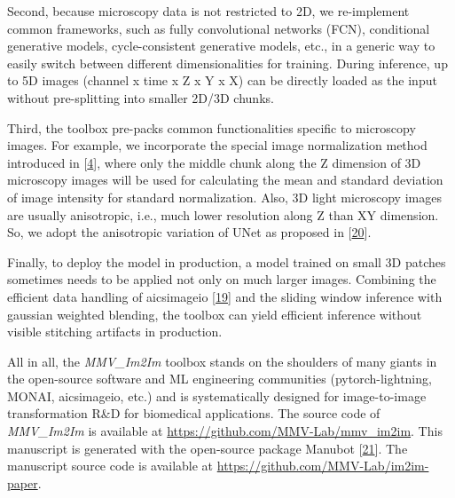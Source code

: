 Second, because microscopy data is not restricted to 2D, we re-implement common frameworks, such as fully convolutional networks (FCN), conditional generative models, cycle-consistent generative models, etc., in a generic way to easily switch between different dimensionalities for training. During inference, up to 5D images (channel x time x Z x Y x X) can be directly loaded as the input without pre-splitting into smaller 2D/3D chunks.

Third, the toolbox pre-packs common functionalities specific to microscopy images. For example, we incorporate the special image normalization method introduced in {[}\protect\hyperlink{ref-Yq8wZ6hc}{4}{]}, where only the middle chunk along the Z dimension of 3D microscopy images will be used for calculating the mean and standard deviation of image intensity for standard normalization. Also, 3D light microscopy images are usually anisotropic, i.e., much lower resolution along Z than XY dimension. So, we adopt the anisotropic variation of UNet as proposed in {[}\protect\hyperlink{ref-jM3v1UjQ}{20}{]}.

Finally, to deploy the model in production, a model trained on small 3D patches sometimes needs to be applied not only on much larger images. Combining the efficient data handling of aicsimageio {[}\protect\hyperlink{ref-gsfWGJKf}{19}{]} and the sliding window inference with gaussian weighted blending, the toolbox can yield efficient inference without visible stitching artifacts in production.

All in all, the \emph{MMV\_Im2Im} toolbox stands on the shoulders of many giants in the open-source software and ML engineering communities (pytorch-lightning, MONAI, aicsimageio, etc.) and is systematically designed for image-to-image transformation R\&D for biomedical applications. The source code of \emph{MMV\_Im2Im} is available at \url{https://github.com/MMV-Lab/mmv_im2im}. This manuscript is generated with the open-source package Manubot {[}\protect\hyperlink{ref-YuJbg3zO}{21}{]}. The manuscript source code is available at \url{https://github.com/MMV-Lab/im2im-paper}.

